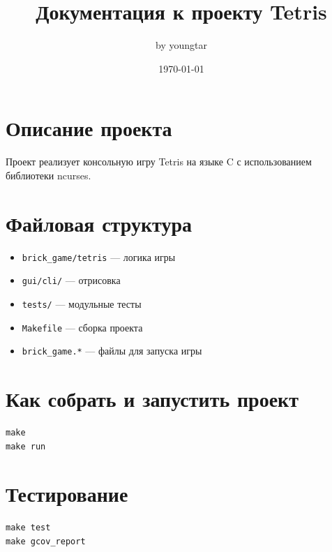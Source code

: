 \documentclass[a4paper,12pt]{article}
\title{Документация к проекту Tetris}
\author{by youngtar}
\date{\today}
\begin{document}
\maketitle

\tableofcontents

\section{Описание проекта}

Проект реализует консольную игру Tetris на языке C с использованием библиотеки ncurses.

\section{Файловая структура}

\begin{itemize}
  \item \texttt{brick\_game/tetris} — логика игры
  \item \texttt{gui/cli/} — отрисовка
  \item \texttt{tests/} — модульные тесты
  \item \texttt{Makefile} — сборка проекта
  \item \texttt{brick\_game.*} — файлы для запуска игры
\end{itemize}

\section{Как собрать и запустить проект}

\begin{verbatim}
make
make run
\end{verbatim}

\section{Тестирование}

\begin{verbatim}
make test
make gcov_report
\end{verbatim}
\end{document}
